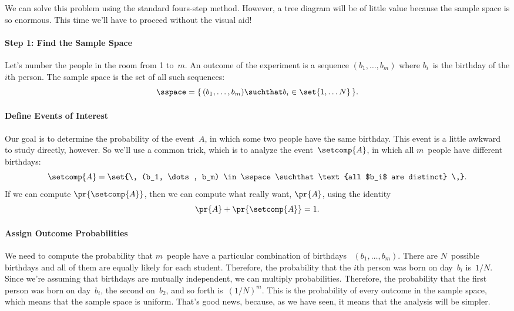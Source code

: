 We can solve this problem using the standard fours-step method.
However, a tree diagram will be of little value because the sample
space is so enormous.  This time we'll have to proceed without the
visual aid!

\paragraph{Step 1: Find the Sample Space}

Let's number the people in the room from 1 to~$m$.  An outcome of the
experiment is a sequence $(b_1, \dots, b_m)$ where $b_i$~is the
birthday of the $i$th person.  The sample space is the set of all such
sequences:
\begin{equation*}
    \sspace = \{\, (b_1, \dots, b_m) \suchthat b_i \in \set{1, \dots
      N} \,\}.
\end{equation*}

\paragraph{Define Events of Interest}

Our goal is to determine the probability of the event~$A$, in which
some two people have the same birthday.  This event is a little
awkward to study directly, however.  So we'll use a common trick,
which is to analyze the  event~$\setcomp{A}$,
in which all $m$~people have different birthdays:
\begin{equation*}
    \setcomp{A} = \set{\, (b_1, \dots, b_m) \in \sspace
                    \suchthat \text{all $b_i$ are distinct} \,}.
\end{equation*}
If we can compute $\pr{\setcomp{A}}$, then we can compute what
really want, $\pr{A}$, using the identity
\begin{equation*}
    \pr{A} + \pr{\setcomp{A}} = 1.
\end{equation*}

\paragraph{Assign Outcome Probabilities}

We need to compute the probability that $m$~people have a particular
combination of birthdays ~$(b_1, \dots, b_m)$.  There are $N$~possible
birthdays and all of them are equally likely for each student.
Therefore, the probability that the $i$th person was born on day~$b_i$
is~$1/N$.  Since we're assuming that birthdays are mutually
independent, we can multiply probabilities.  Therefore, the
probability that the first person was born on day~$b_i$, the second
on~$b_2$, and so forth is~$(1/N)^m$.  This is the probability of every
outcome in the sample space, which means that the sample space is
uniform.  That's good news, because, as we have seen, it means that
the analysis will be simpler.

